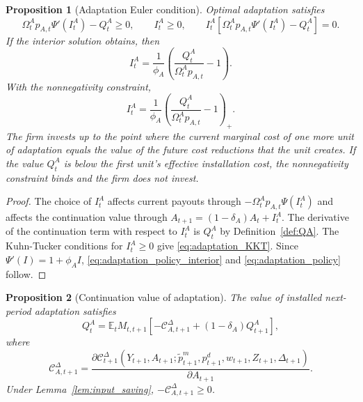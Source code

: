 ﻿\documentclass[12pt]{article}
\newtheorem{proposition}{Proposition}
\theoremstyle{remark}
\newcommand{\E}{\mathbb E}
\newcommand{\C}{\mathcal C}
\begin{document}
\begin{proposition}[Adaptation Euler condition]\label{prop:adaptation_foc}
Optimal adaptation satisfies
\begin{equation}
    \Omega_t^A p_{A,t}\Psi'(I_t^A) - Q_t^A\ge 0,
    \qquad
    I_t^A\ge 0,
    \qquad
    I_t^A
    \left[
        \Omega_t^A p_{A,t}\Psi'(I_t^A) - Q_t^A
    \right]=0.
    \label{eq:adaptation_KKT}
\end{equation}
If the interior solution obtains, then
\begin{equation}
    I_t^A
    =
    \frac{1}{\phi_A}
    \left(
        \frac{Q_t^A}{\Omega_t^A p_{A,t}}-1
    \right).
    \label{eq:adaptation_policy_interior}
\end{equation}
With the nonnegativity constraint,
\begin{equation}
    I_t^A
    =
    \frac{1}{\phi_A}
    \left(
        \frac{Q_t^A}{\Omega_t^A p_{A,t}}-1
    \right)_+.
    \label{eq:adaptation_policy}
\end{equation}
The firm invests up to the point where the current marginal cost of one more unit of adaptation
equals the value of the future cost reductions that the unit creates. If the value $Q_t^A$ is below
the first unit's effective installation cost, the nonnegativity constraint binds and the firm does
not invest.
\end{proposition}

\begin{proof}
The choice of $I_t^A$ affects current payouts through
$-\Omega_t^A p_{A,t}\Psi(I_t^A)$ and affects the continuation value through
$A_{t+1}=(1-\delta_A)A_t+I_t^A$. The derivative of the continuation term with respect to
$I_t^A$ is $Q_t^A$ by Definition~\ref{def:QA}. The Kuhn-Tucker conditions for
$I_t^A\ge 0$ give \eqref{eq:adaptation_KKT}. Since $\Psi'(I)=1+\phi_A I$,
\eqref{eq:adaptation_policy_interior} and \eqref{eq:adaptation_policy} follow.
\end{proof}

\begin{proposition}[Continuation value of adaptation]\label{prop:QA_recursion}
The value of installed next-period adaptation satisfies
\begin{equation}
    Q_t^A
    =
    \E_t M_{t,t+1}
    \left[
        -\C_{A,t+1}^\Delta
        +
        (1-\delta_A)Q_{t+1}^A
    \right],
    \label{eq:QA_recursion}
\end{equation}
where
\begin{equation}
    \C_{A,t+1}^\Delta
    =
    \frac{\partial
    \C_{t+1}^\Delta(Y_{t+1},A_{t+1};
    \tilde p_{t+1}^m,p_{t+1}^d,w_{t+1},Z_{t+1},\Delta_{t+1})}
    {\partial A_{t+1}}.
    \label{eq:CA_def}
\end{equation}
Under Lemma~\ref{lem:input_saving}, $-\C_{A,t+1}^\Delta\ge 0$.
\end{proposition}
\end{document}

